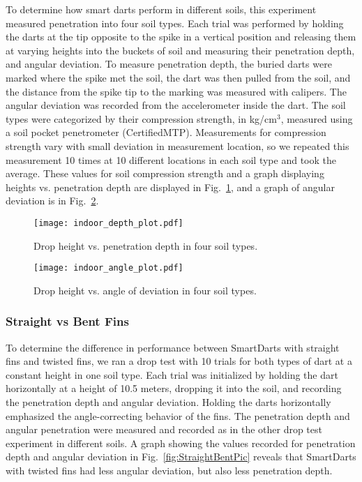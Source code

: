 To determine how smart darts perform in different soils, this experiment measured penetration into four soil types. Each trial was performed by holding the darts at the tip opposite to the spike in a vertical position and releasing them at varying heights into the buckets of soil and measuring their penetration depth, and angular deviation. To measure penetration depth, the buried darts were marked where the spike met the soil, the dart was then pulled from the soil, and the distance from the spike tip to the marking was measured with calipers. The angular deviation was recorded from the accelerometer inside the dart. The soil types were categorized by their compression strength, in kg/cm$^3$, measured using a soil pocket penetrometer (CertifiedMTP). Measurements for compression strength vary with small deviation in measurement location, so we repeated this measurement 10 times at 10 different locations in each soil type and took the average. These values for soil compression strength and a graph displaying heights vs. penetration depth are displayed in Fig.~\ref{fig:DepthPlotIndoors}, and a graph of angular deviation is in Fig.~\ref{fig:AnglePlotIndoors}. 


\begin{figure} \centering
{\texttt{[image: indoor\_depth\_plot.pdf]}}
\caption{Drop height vs. penetration depth in four soil types.} 
\label{fig:DepthPlotIndoors}
\end{figure}

\begin{figure} \centering
{\texttt{[image: indoor\_angle\_plot.pdf]}}
\caption{Drop height vs. angle of deviation in four soil types.} 
\label{fig:AnglePlotIndoors}
\vspace{-1em}
\end{figure}

\subsubsection{Straight vs Bent Fins}

To determine the difference in performance between SmartDarts with straight fins and twisted fins, we ran a drop test with 10 trials for both types of dart at a constant height in one soil type. Each trial was initialized by holding the dart horizontally at a height of 10.5 meters, dropping it into the soil, and recording the penetration depth and angular deviation. Holding the darts horizontally emphasized the angle-correcting behavior of the fins. The penetration depth and angular penetration were measured and recorded as in the other drop test experiment in different soils. A graph showing the values recorded for penetration depth and angular deviation in Fig.~\ref{fig:StraightBentPic}  reveals that SmartDarts with twisted fins had less angular deviation, but also less penetration depth. 

